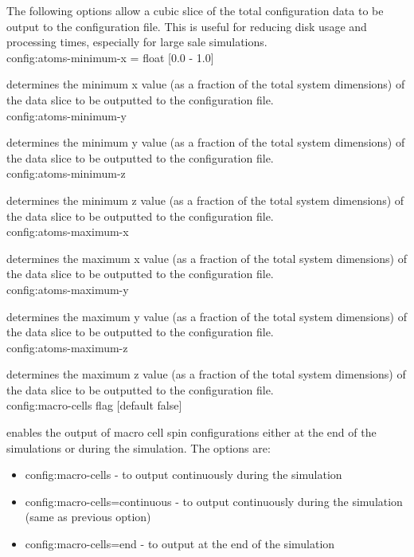 The following options allow a cubic slice of the total configuration data to
be output to the configuration file. This is useful for reducing disk usage and
processing times, especially for large sale simulations.\\

{\zicf config:atoms-minimum-x = float [0.0 - 1.0]}
determines the minimum x value (as a fraction of the total system dimensions)
of the data slice to be outputted to the configuration file.\\

{\zicf config:atoms-minimum-y}
determines the minimum y value (as a fraction of the total system dimensions)
of the data slice to be outputted to the configuration file.\\

{\zicf config:atoms-minimum-z}
determines the minimum z value (as a fraction of the total system dimensions)
of the data slice to be outputted to the configuration file.\\

{\zicf config:atoms-maximum-x}
determines the maximum x value (as a fraction of the total system dimensions)
of the data slice to be outputted to the configuration file.\\

{\zicf config:atoms-maximum-y}
determines the maximum y value (as a fraction of the total system dimensions)
of the data slice to be outputted to the configuration file.\\

{\zicf config:atoms-maximum-z}
determines the maximum z value (as a fraction of the total system dimensions)
of the data slice to be outputted to the configuration file.\\

{\zicf config:macro-cells flag [default false]}
enables the output of macro cell spin configurations either at the end of the simulations or during the simulation. The options are:
\begin{itemize}
  \item[] config:macro-cells - to output continuously during the simulation
  \item[] config:macro-cells=continuous - to output continuously during the simulation (same as previous option)
  \item[] config:macro-cells=end - to output at the end of the simulation
\end{itemize}

